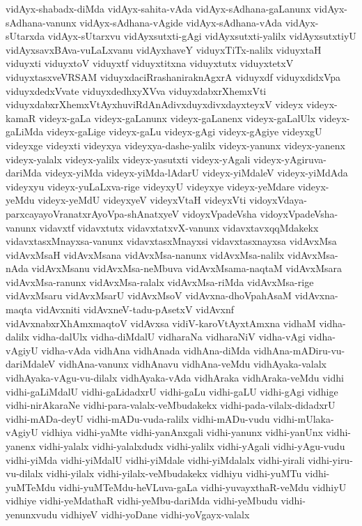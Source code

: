 {vidAyx-shabadx-diMda
vidAyx-sahita-vAda
vidAyx-sAdhana-gaLanunx
vidAyx-sAdhana-vanunx
vidAyx-sAdhana-vAgide
vidAyx-sAdhana-vAda
vidAyx-sUtarxda
vidAyx-sUtarxvu
vidAyxsutxti-gAgi
vidAyxsutxti-yalilx
vidAyxsutxtiyU
vidAyxsavxBAva-vuLaLxvanu
vidAyxhaveY
viduyxTiTx-nalilx
viduyxtaH
viduyxti
viduyxtoV
viduyxtf
viduyxtitxna
viduyxtutx
viduyxtetxV
viduyxtasxveVRSAM
viduyxdaciRrashaniraknAgxrA
viduyxdf
viduyxdidxVpa
viduyxdedxVvate
viduyxdedhxyXVva
viduyxdabxrXhemxVti
viduyxdabxrXhemxVtAyxhuviRdAnAdivxduyxdivxdayxteyxV
videyx
videyx-kamaR
videyx-gaLa
videyx-gaLanunx
videyx-gaLanenx
videyx-gaLalUlx
videyx-gaLiMda
videyx-gaLige
videyx-gaLu
videyx-gAgi
videyx-gAgiye
videyxgU
videyxge
videyxti
videyxya
videyxya-dashe-yalilx
videyx-yanunx
videyx-yanenx
videyx-yalalx
videyx-yalilx
videyx-yasutxti
videyx-yAgali
videyx-yAgiruva-dariMda
videyx-yiMda
videyx-yiMda-lAdarU
videyx-yiMdaleV
videyx-yiMdAda
videyxyu
videyx-yuLaLxva-rige
videyxyU
videyxye
videyx-yeMdare
videyx-yeMdu
videyx-yeMdU
videyxyeV
videyxVtaH
videyxVti
vidoyxVdaya-parxcayayoVranatxrAyoVpa-shAnatxyeV
vidoyxVpadeVsha
vidoyxVpadeVsha-vanunx
vidavxtf
vidavxtutx
vidavxtatxvX-vanunx
vidavxtavxqqMdakekx
vidavxtasxMnayxsa-vanunx
vidavxtasxMnayxsi
vidavxtasxnayxsa
vidAvxMsa
vidAvxMsaH
vidAvxMsana
vidAvxMsa-nanunx
vidAvxMsa-nalilx
vidAvxMsa-nAda
vidAvxMsanu
vidAvxMsa-neMbuva
vidAvxMsama-naqtaM
vidAvxMsara
vidAvxMsa-ranunx
vidAvxMsa-ralalx
vidAvxMsa-riMda
vidAvxMsa-rige
vidAvxMsaru
vidAvxMsarU
vidAvxMsoV
vidAvxna-dhoVpahAsaM
vidAvxna-maqta
vidAvxniti
vidAvxneV-tadu-pAsetxV
vidAvxnf
vidAvxnabxrXhAmxmaqtoV
vidAvxsa
vidiV-karoVtAyxtAmxna
vidhaM
vidha-dalilx
vidha-dalUlx
vidha-diMdalU
vidharaNa
vidharaNiV
vidha-vAgi
vidha-vAgiyU
vidha-vAda
vidhAna
vidhAnada
vidhAna-diMda
vidhAna-mADiru-vu-dariMdaleV
vidhAna-vanunx
vidhAnavu
vidhAna-veMdu
vidhAyaka-valalx
vidhAyaka-vAgu-vu-dilalx
vidhAyaka-vAda
vidhAraka
vidhAraka-veMdu
vidhi
vidhi-gaLiMdalU
vidhi-gaLidadxrU
vidhi-gaLu
vidhi-gaLU
vidhi-gAgi
vidhige
vidhi-nirAkaraNe
vidhi-para-valalx-veMbudakekx
vidhi-pada-vilalx-didadxrU
vidhi-mADa-deyU
vidhi-mADu-vuda-ralilx
vidhi-mADu-vudu
vidhi-mUlaka-vAgiyU
vidhiya
vidhi-yaMte
vidhi-yanAnxgali
vidhi-yanunx
vidhi-yanUnx
vidhi-yanenx
vidhi-yalalx
vidhi-yalalxdudx
vidhi-yalilx
vidhi-yAgali
vidhi-yAgu-vudu
vidhi-yiMda
vidhi-yiMdalU
vidhi-yiMdale
vidhi-yiMdalalx
vidhi-yirali
vidhi-yiru-vu-dilalx
vidhi-yilalx
vidhi-yilalx-veMbudakekx
vidhiyu
vidhi-yuMTu
vidhi-yuMTeMdu
vidhi-yuMTeMdu-heVLuva-gaLa
vidhi-yuvayxthaR-veMdu
vidhiyU
vidhiye
vidhi-yeMdathaR
vidhi-yeMbu-dariMda
vidhi-yeMbudu
vidhi-yenunxvudu
vidhiyeV
vidhi-yoDane
vidhi-yoVgayx-valalx
}
